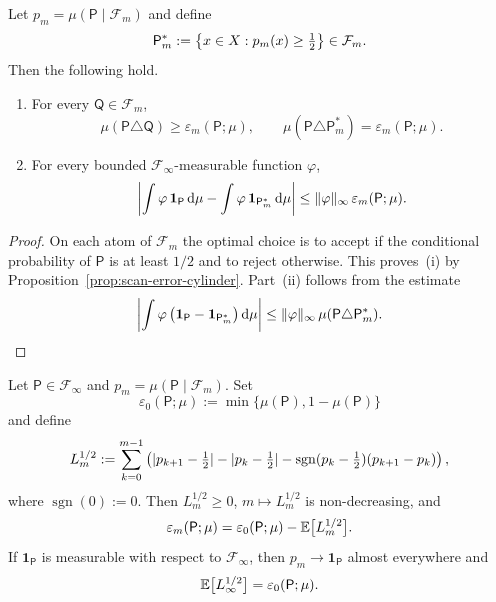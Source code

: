 \begin{proposition}
\label{prop:bayes-optimality}
Let \(p_m=\mu(\mathsf{P}\mid\mathcal{F}_m)\) and define
\[
  \mathsf{P}_m^\ast := \left\{x\in X:p_m(x)\geq \tfrac12\right\}\in\mathcal{F}_m.
\]
Then the following hold.
\begin{enumerate}[label=(\roman*)]
  \item For every \(\mathsf{Q}\in\mathcal{F}_m\),
    \[
      \mu(\mathsf{P}\triangle \mathsf{Q})
      \geq \varepsilon_m(\mathsf{P};\mu),
      \qquad
      \mu(\mathsf{P}\triangle \mathsf{P}_m^\ast)
      = \varepsilon_m(\mathsf{P};\mu).
    \]
  \item For every bounded \(\mathcal{F}_\infty\)-measurable function
    \(\varphi\),
    \[
      \left|
        \int \varphi\,\mathbf{1}_{\mathsf{P}}\,\mathrm{d}\mu
        - \int \varphi\,\mathbf{1}_{\mathsf{P}_m^\ast}\,\mathrm{d}\mu
      \right|
      \leq \lVert \varphi\rVert_\infty\,
           \varepsilon_m(\mathsf{P};\mu).
    \]
\end{enumerate}
\end{proposition}

\begin{proof}
On each atom of \(\mathcal{F}_m\) the optimal choice is to accept if the
conditional probability of \(\mathsf{P}\) is at least \(1/2\) and to
reject otherwise.  This proves~(i) by
Proposition~\ref{prop:scan-error-cylinder}.  Part~(ii) follows from the
estimate
\[
  \left|
    \int \varphi\,
      \bigl(\mathbf{1}_{\mathsf{P}}
            -\mathbf{1}_{\mathsf{P}_m^\ast}\bigr)\,\mathrm{d}\mu
  \right|
  \leq \lVert \varphi\rVert_\infty\,
       \mu(\mathsf{P}\triangle \mathsf{P}_m^\ast).
\]
\end{proof}

\begin{theorem}
\label{thm:tanaka-stokes}
Let \(\mathsf{P}\in\mathcal{F}_\infty\) and
\(p_m=\mu(\mathsf{P}\mid \mathcal{F}_m)\).  Set
\[
  \varepsilon_0(\mathsf{P};\mu)
  := \min\{\mu(\mathsf{P}),1-\mu(\mathsf{P})\}
\]
and define
\[
  L_m^{1/2}
  := \sum_{k=0}^{m-1}
      \left(
        \lvert p_{k+1}-\tfrac12\rvert
        - \lvert p_k-\tfrac12\rvert
        - \operatorname{sgn}(p_k-\tfrac12)(p_{k+1}-p_k)
      \right),
\]
where \(\operatorname{sgn}(0):=0\).  Then \(L_m^{1/2}\geq 0\),
\(m\mapsto L_m^{1/2}\) is non-decreasing, and
\[
  \varepsilon_m(\mathsf{P};\mu)
  = \varepsilon_0(\mathsf{P};\mu)
    - \mathbb{E}\bigl[L_m^{1/2}\bigr].
\]
If \(\mathbf{1}_{\mathsf{P}}\) is measurable with respect to
\(\mathcal{F}_\infty\), then \(p_m\to \mathbf{1}_{\mathsf{P}}\) almost
everywhere and
\[
  \mathbb{E}\bigl[L_\infty^{1/2}\bigr]
  = \varepsilon_0(\mathsf{P};\mu).
\]
\end{theorem}

